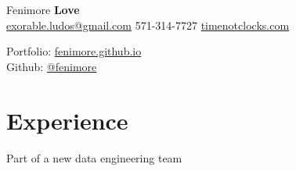 \documentclass[]{deedy-resume-openfont}
\begin{document}
%
%

%
%
\hspace{-5.5mm}
\begin{minipage}[t]{.6\textwidth}
{\Huge Fenimore {\textbf{Love}}}\\
\href{mailto:exorable.ludos@gmail.com}{exorable.ludos@gmail.com} \textbullet{} 571-314-7727 \textbullet{} \href{https://timenotclocks.com}{timenotclocks.com}\\
\end{minipage}
\hfill
\begin{minipage}[t]{.3\textwidth}
Portfolio: \href{https://fenimore.github.io}{fenimore.github.io}\\
Github: \href{https://github.com/fenimore}{@fenimore}
\end{minipage}
\namesection{}{} %


\section{Experience}
\vspace{\topsep} %

\vspace{\topsep} %
\begin{tightemize}
\item Part of a new data engineering team
\end{tightemize}

\vspace{\topsep} %
\end{document}
